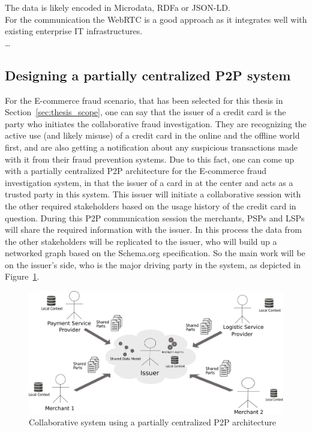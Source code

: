  The data is likely encoded in Microdata, \gls{RDFa} or \gls{JSON-LD}. \\

For the communication the \gls{WebRTC} is a good approach as it integrates well with existing enterprise IT infrastructures.
\\

\ldots


\subsection{Designing a partially centralized \gls{P2P} system}
\label{subsec:p2p_partially_centralized_system}

For the \gls{E-commerce} fraud scenario, that has been selected for this thesis in Section~\ref{sec:thesis_scope}, one can say that the issuer of a credit card is the party who initiates the collaborative fraud investigation. They are recognizing the active use (and likely misuse) of a credit card in the online and the offline world first, and are also getting a notification about any suspicious transactions made with it from their fraud prevention systems. Due to this fact, one can come up with a partially centralized \gls{P2P} architecture for the \gls{E-commerce} fraud investigation system, in that the issuer of a card in at the center and acts as a trusted party in this system. This issuer will initiate a collaborative session with the other required stakeholders based on the usage history of the credit card in question. During this \gls{P2P} communication session the merchants, \gls{PSP}s and \gls{LSP}s will share the required information with the issuer. In this process the data from the other stakeholders will be replicated to the issuer, who will build up a networked graph based on the Schema.org specification. So the main work will be on the issuer's side, who is the major driving party in the system, as depicted in Figure~\ref{fig:images_p2p_centralized}.\@

\begin{figure}[H]
	\centering
		\includegraphics[width=0.9\columnwidth]{images/system_P2P_centralized.pdf}
	\caption{Collaborative system using a partially centralized \gls{P2P} architecture}
\label{fig:images_p2p_centralized}
\end{figure}

